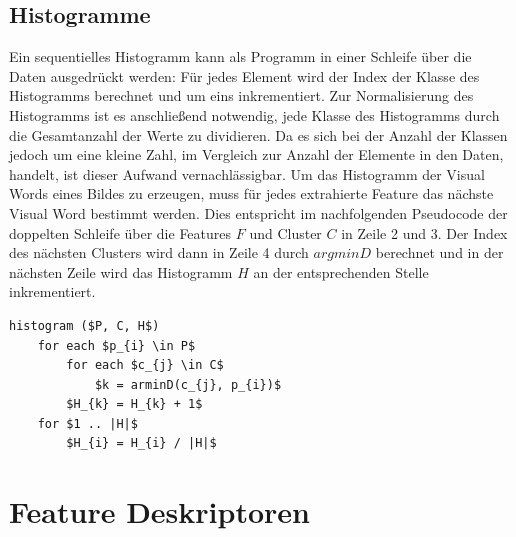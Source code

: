 
\subsection{Histogramme}

Ein sequentielles Histogramm kann als Programm in einer Schleife über die Daten ausgedrückt werden: Für jedes Element wird der Index der Klasse des Histogramms berechnet und um eins inkrementiert. Zur Normalisierung des Histogramms ist es anschließend notwendig, jede Klasse des Histogramms durch die Gesamtanzahl der Werte zu dividieren. Da es sich bei der Anzahl der Klassen jedoch um eine kleine Zahl, im Vergleich zur Anzahl der Elemente in den Daten, handelt, ist dieser Aufwand vernachlässigbar.
Um das Histogramm der Visual Words eines Bildes zu erzeugen, muss für jedes extrahierte Feature das nächste Visual Word bestimmt werden. Dies entspricht im nachfolgenden Pseudocode der doppelten Schleife über die Features $F$ und Cluster $C$ in Zeile 2 und 3. Der Index des nächsten Clusters wird dann in Zeile 4 durch $argmin D$ berechnet und in der nächsten Zeile wird das Histogramm $H$ an der entsprechenden Stelle inkrementiert.

\begin{lstlisting}[mathescape=true]
histogram ($P, C, H$)
	for each $p_{i} \in P$
		for each $c_{j} \in C$
			$k = arminD(c_{j}, p_{i})$ 
		$H_{k} = H_{k} + 1$		
	for $1 .. |H|$
		$H_{i} = H_{i} / |H|$
\end{lstlisting}

\section{Feature Deskriptoren}
\label{extraction}

